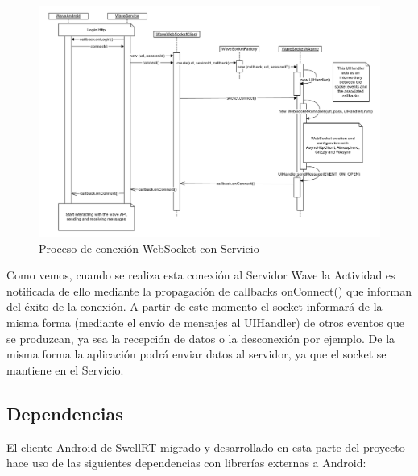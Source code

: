   \begin{figure}[H]
   \centering
	\includegraphics[keepaspectratio, scale=0.43]{Media/Diagrams/waveServerConnectionSequenceDiagram.png}
    \caption{Proceso de conexión WebSocket con Servicio}
   \label{fig:sequenceDiagram_waveWebSocket}
  \end{figure}
     
      Como vemos, cuando se realiza esta conexión al Servidor Wave la Actividad es notificada de ello mediante la propagación de callbacks onConnect() que informan del éxito de la conexión. A partir de este momento el socket informará de la misma forma (mediante el envío de mensajes al UIHandler) de otros eventos que se produzcan, ya sea la recepción de datos o la desconexión por ejemplo. De la misma forma la aplicación podrá enviar datos al servidor, ya que el socket se mantiene en el Servicio. 
       
    \subsection{Dependencias}
    
    El cliente Android de SwellRT migrado y desarrollado en esta parte del proyecto hace uso de las siguientes dependencias con librerías externas a Android:

